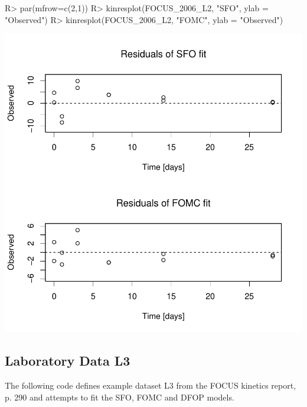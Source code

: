 \documentclass[12pt,a4paper]{article}
\begin{document}
\begin{Schunk}
\begin{Sinput}
R> par(mfrow=c(2,1))
R> kinresplot(FOCUS_2006_L2, "SFO", ylab = "Observed")
R> kinresplot(FOCUS_2006_L2, "FOMC", ylab = "Observed")
\end{Sinput}
\end{Schunk}
\includegraphics{examples-L2_resplot}

\subsection{Laboratory Data L3}

The following code defines example dataset L3 from the FOCUS kinetics
report, p. 290 and attempts to fit the SFO, FOMC and DFOP models.
\end{document}
